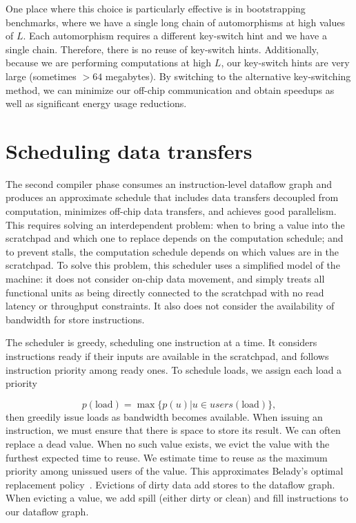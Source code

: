 One place where this choice is particularly effective is in bootstrapping benchmarks, where we have a single long chain of automorphisms at high values of $L$.
Each automorphism requires a different key-switch hint and we have a single chain. Therefore, there is no reuse of key-switch hints. Additionally, because we are performing computations at high $L$, our key-switch hints are very large (sometimes $>64$ megabytes). By switching to the alternative key-switching method, we can minimize our off-chip communication
and obtain speedups as well as significant energy usage reductions.

\section{Scheduling data transfers} \label{sec:datatransfers}

The second compiler phase consumes an instruction-level dataflow graph and produces 
an approximate schedule that includes data transfers decoupled from computation,
minimizes off-chip data transfers, and achieves good parallelism.
This requires solving an interdependent problem: when to bring a value into the scratchpad and which one to replace
depends on the computation schedule; and to prevent stalls, the computation schedule depends on which values are in the scratchpad.
To solve this problem, this scheduler uses a simplified model of the machine:
it does not consider on-chip data movement, and simply treats all functional units 
as being directly connected to the scratchpad with no read latency or throughput constraints.
It also does not consider the availability of bandwidth for store instructions.

The scheduler is greedy, scheduling one instruction at a time.
It considers instructions ready if their inputs are available in the scratchpad,
and follows instruction priority among ready ones.
To schedule loads, we assign each load a priority

\vspace{-12pt}
\begin{equation*}
p(\text{load}) = \max \{ p(u) | u \in users(\text{load})\},
\end{equation*}
then greedily issue loads as bandwidth becomes available.
When issuing an instruction, we must ensure that there is space to store its result.
We can often replace a dead value. %
When no such value exists, we evict the value with the furthest expected time to reuse.
We estimate time to reuse as the maximum priority among unissued users of the value. 
This approximates Belady's optimal replacement policy~\cite{belady1966study}. 
Evictions of dirty data add stores to the dataflow graph.
When evicting a value, we add spill (either dirty or clean) and fill instructions to our dataflow graph.

